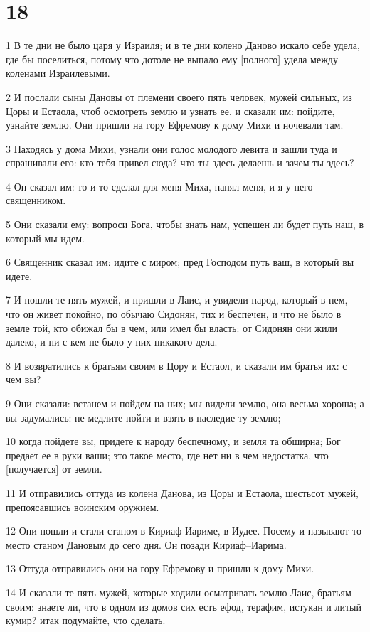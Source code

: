 \chapter{18}

\par 1 В те дни не было царя у Израиля; и в те дни колено Даново искало себе удела, где бы поселиться, потому что дотоле не выпало ему [полного] удела между коленами Израилевыми.
\par 2 И послали сыны Дановы от племени своего пять человек, мужей сильных, из Цоры и Естаола, чтоб осмотреть землю и узнать ее, и сказали им: пойдите, узнайте землю. Они пришли на гору Ефремову к дому Михи и ночевали там.
\par 3 Находясь у дома Михи, узнали они голос молодого левита и зашли туда и спрашивали его: кто тебя привел сюда? что ты здесь делаешь и зачем ты здесь?
\par 4 Он сказал им: то и то сделал для меня Миха, нанял меня, и я у него священником.
\par 5 Они сказали ему: вопроси Бога, чтобы знать нам, успешен ли будет путь наш, в который мы идем.
\par 6 Священник сказал им: идите с миром; пред Господом путь ваш, в который вы идете.
\par 7 И пошли те пять мужей, и пришли в Лаис, и увидели народ, который в нем, что он живет покойно, по обычаю Сидонян, тих и беспечен, и что не было в земле той, кто обижал бы в чем, или имел бы власть: от Сидонян они жили далеко, и ни с кем не было у них никакого дела.
\par 8 И возвратились к братьям своим в Цору и Естаол, и сказали им братья их: с чем вы?
\par 9 Они сказали: встанем и пойдем на них; мы видели землю, она весьма хороша; а вы задумались: не медлите пойти и взять в наследие ту землю;
\par 10 когда пойдете вы, придете к народу беспечному, и земля та обширна; Бог предает ее в руки ваши; это такое место, где нет ни в чем недостатка, что [получается] от земли.
\par 11 И отправились оттуда из колена Данова, из Цоры и Естаола, шестьсот мужей, препоясавшись воинским оружием.
\par 12 Они пошли и стали станом в Кириаф-Иариме, в Иудее. Посему и называют то место станом Дановым до сего дня. Он позади Кириаф--Иарима.
\par 13 Оттуда отправились они на гору Ефремову и пришли к дому Михи.
\par 14 И сказали те пять мужей, которые ходили осматривать землю Лаис, братьям своим: знаете ли, что в одном из домов сих есть ефод, терафим, истукан и литый кумир? итак подумайте, что сделать.
